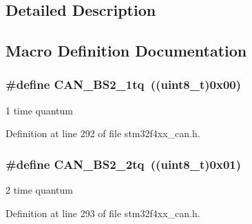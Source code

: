 \subsection{Detailed Description}


\subsection{Macro Definition Documentation}
\hypertarget{group___c_a_n__time__quantum__in__bit__segment__2_gad9af25a3f61df7b09b8d6a5e81d8027e}{
\subsubsection[{C\-A\-N\-\_\-\-B\-S2\-\_\-1tq}]{\setlength{\rightskip}{0pt plus 5cm}\#define C\-A\-N\-\_\-\-B\-S2\-\_\-1tq~((uint8\-\_\-t)0x00)}}\label{group___c_a_n__time__quantum__in__bit__segment__2_gad9af25a3f61df7b09b8d6a5e81d8027e}
1 time quantum 

Definition at line 292 of file stm32f4xx\-\_\-can.\-h.

\hypertarget{group___c_a_n__time__quantum__in__bit__segment__2_gac43d82f74990620499f1998187ff3602}{
\subsubsection[{C\-A\-N\-\_\-\-B\-S2\-\_\-2tq}]{\setlength{\rightskip}{0pt plus 5cm}\#define C\-A\-N\-\_\-\-B\-S2\-\_\-2tq~((uint8\-\_\-t)0x01)}}\label{group___c_a_n__time__quantum__in__bit__segment__2_gac43d82f74990620499f1998187ff3602}
2 time quantum 

Definition at line 293 of file stm32f4xx\-\_\-can.\-h.


